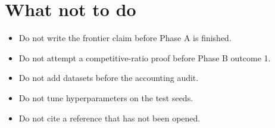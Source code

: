 \documentclass[11pt]{article}
\begin{document}
\section*{What not to do}
\begin{itemize}
  \item Do not write the frontier claim before Phase A is finished.
  \item Do not attempt a competitive-ratio proof before Phase B outcome 1.
  \item Do not add datasets before the accounting audit.
  \item Do not tune hyperparameters on the test seeds.
  \item Do not cite a reference that has not been opened.
\end{itemize}
\end{document}
